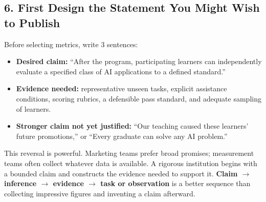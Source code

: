 \subsection*{6. First Design the Statement You Might Wish to Publish}

Before selecting metrics, write 3 sentences:

\begin{itemize}[leftmargin=1.5em, itemsep=0.4em]
    \item \textbf{Desired claim:} ``After the program, participating learners can independently evaluate a specified class of AI applications to a defined standard.''
    \item \textbf{Evidence needed:} representative unseen tasks, explicit assistance conditions, scoring rubrics, a defensible pass standard, and adequate sampling of learners.
    \item \textbf{Stronger claim not yet justified:} ``Our teaching caused these learners' future promotions,'' or ``Every graduate can solve any AI problem.''
\end{itemize}

This reversal is powerful. Marketing teams prefer broad promises; measurement teams often collect whatever data is available. A rigorous institution begins with a bounded claim and constructs the evidence needed to support it. \textbf{Claim $\to$ inference $\to$ evidence $\to$ task or observation} is a better sequence than collecting impressive figures and inventing a claim afterward.
